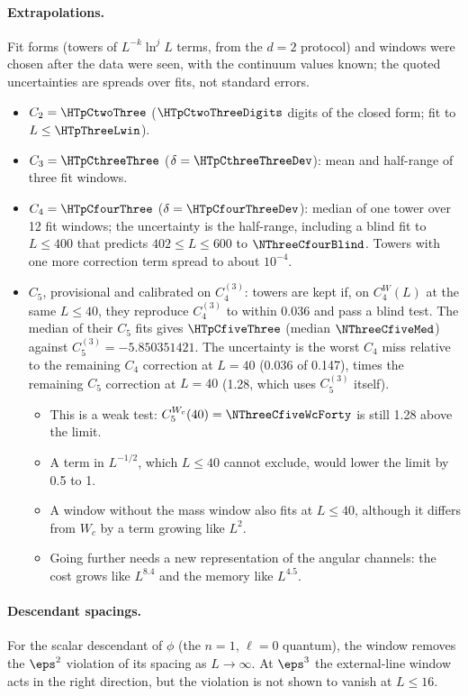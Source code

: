 \paragraph{Extrapolations.}
Fit forms (towers of $L^{-k}\ln^jL$ terms, from the $d=2$ protocol) and windows were chosen after the data were seen,
with the continuum values known; the quoted uncertainties are spreads over fits, not standard errors.
\begin{itemize}
\item $C_2=\HTpCtwoThree$ ($\HTpCtwoThreeDigits$ digits of the closed form; fit to $L\le\HTpThreeLwin$).
\item $C_3=\HTpCthreeThree$ ($\delta=\HTpCthreeThreeDev$): mean and half-range of three fit windows.
\item $C_4=\HTpCfourThree$ ($\delta=\HTpCfourThreeDev$): median of one tower over 12 fit windows; the uncertainty is
 the half-range, including a blind fit to $L\le400$ that predicts $402\le L\le600$ to $\NThreeCfourBlind$. Towers with
 one more correction term spread to about $10^{-4}$.
\item $C_5$, provisional and calibrated on $C_4^{(3)}$: towers are kept if, on $C_4^W(L)$ at the same $L\le40$, they
 reproduce $C_4^{(3)}$ to within 0.036 and pass a blind test. The median of their $C_5$ fits gives $\HTpCfiveThree$
 (median $\NThreeCfiveMed$) against $C_5^{(3)}=-5.850351421$. The uncertainty is the worst $C_4$ miss relative to the
 remaining $C_4$ correction at $L=40$ (0.036 of 0.147), times the remaining $C_5$ correction at $L=40$ (1.28, which
 uses $C_5^{(3)}$ itself).
 \begin{itemize}
 \item This is a weak test: $C_5^{W_c}(40)=\NThreeCfiveWcForty$ is still 1.28 above the limit.
 \item A term in $L^{-1/2}$, which $L\le40$ cannot exclude, would lower the limit by 0.5 to 1.
 \item A window without the mass window also fits at $L\le40$, although it differs from $W_c$ by a term growing like
  $L^2$.
 \item Going further needs a new representation of the angular channels: the cost grows like $L^{8.4}$ and the memory
  like $L^{4.5}$.
 \end{itemize}
\end{itemize}

\paragraph{Descendant spacings.}
For the scalar descendant of $\phi$ (the $n=1$, $\ell=0$ quantum), the window removes the $\eps^2$ violation of its
spacing as $L\to\infty$. At $\eps^3$ the external-line window acts in the right direction, but the violation is not shown
to vanish at $L\le16$.

